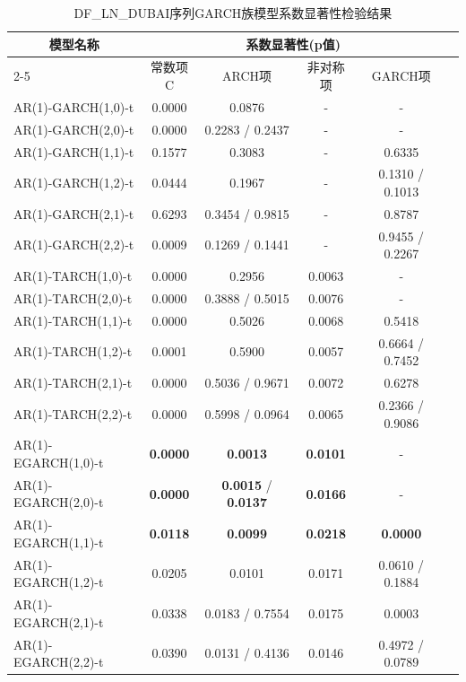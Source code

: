 \documentclass[12pt,a4paper]{ctexart}
\begin{document}
\begin{table}[H]
\centering
\caption{DF\_LN\_DUBAI序列GARCH族模型系数显著性检验结果}
\label{tab:dubai_garch_p}
\setlength{\tabcolsep}{4pt}  %
\begin{tabular}{lccccc}
\toprule[1.2pt]
\multirow{2}{*}{$\quad\quad\,\,\,\,\,$模型名称} & \multicolumn{4}{c}{系数显著性(p值)}  \\
\cmidrule(lr){2-5}
& 常数项C & ARCH项 & 非对称项 & GARCH项 \\
\midrule[0.75pt]
AR(1)-GARCH(1,0)-t     & 0.0000 & 0.0876 & - & - \\
AR(1)-GARCH(2,0)-t     & 0.0000 & 0.2283 / 0.2437 & - & - \\
AR(1)-GARCH(1,1)-t     & 0.1577 & 0.3083 & - & 0.6335 \\
AR(1)-GARCH(1,2)-t     & 0.0444 & 0.1967 & - & 0.1310 / 0.1013 \\
AR(1)-GARCH(2,1)-t     & 0.6293 & 0.3454 / 0.9815 & - & 0.8787 \\
AR(1)-GARCH(2,2)-t     & 0.0009 & 0.1269 / 0.1441 & - & 0.9455 / 0.2267 \\
\midrule
AR(1)-TARCH(1,0)-t     & 0.0000 & 0.2956 & 0.0063 & - \\
AR(1)-TARCH(2,0)-t     & 0.0000 & 0.3888 / 0.5015 & 0.0076 & - \\
AR(1)-TARCH(1,1)-t     & 0.0000 & 0.5026 & 0.0068 & 0.5418 \\
AR(1)-TARCH(1,2)-t     & 0.0001 & 0.5900 & 0.0057 & 0.6664 / 0.7452 \\
AR(1)-TARCH(2,1)-t     & 0.0000 & 0.5036 / 0.9671 & 0.0072 & 0.6278 \\
AR(1)-TARCH(2,2)-t     & 0.0000 & 0.5998 / 0.0964 & 0.0065 & 0.2366 / 0.9086 \\
\midrule
AR(1)-EGARCH(1,0)-t    & \textbf{0.0000} & \textbf{0.0013} & \textbf{0.0101} & - \\
AR(1)-EGARCH(2,0)-t    & \textbf{0.0000} & \textbf{0.0015} / \textbf{0.0137} & \textbf{0.0166} & - \\
AR(1)-EGARCH(1,1)-t    & \textbf{0.0118} & \textbf{0.0099} & \textbf{0.0218} & \textbf{0.0000} \\
AR(1)-EGARCH(1,2)-t    & 0.0205 & 0.0101 & 0.0171 & 0.0610 / 0.1884 \\
AR(1)-EGARCH(2,1)-t    & 0.0338 & 0.0183 / 0.7554 & 0.0175 & 0.0003 \\
AR(1)-EGARCH(2,2)-t    & 0.0390 & 0.0131 / 0.4136 & 0.0146 & 0.4972 / 0.0789 \\
\bottomrule[1.2pt]
\end{tabular}
\end{table}
\end{document}
